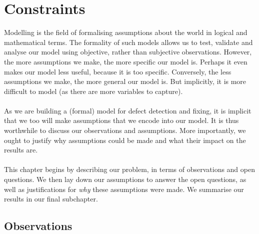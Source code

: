 \section{Constraints} \label{constraints}

Modelling is the field of formalising assumptions about the world in logical and mathematical terms.
The formality of such models allows us to test, validate and analyse our model using objective, rather than subjective observations.
However, the more assumptions we make, the more specific our model is.
Perhaps it even makes our model less useful, because it is too specific.
Conversely, the less assumptions we make, the more general our model is.
But implicitly, it is more difficult to model (as there are more variables to capture).\\
\\
As we are building a (formal) model for defect detection and fixing, it is implicit that we too will make assumptions that we encode into our model.
It is thus worthwhile to discuss our observations and assumptions.
More importantly, we ought to justify why assumptions could be made and what their impact on the results are.\\
\\
This chapter begins by describing our problem, in terms of observations and open questions.
We then lay down our assumptions to answer the open questions, as well as justifications for {\em why} these assumptions were made.
We summarise our results in our final subchapter.

\subsection{Observations}

